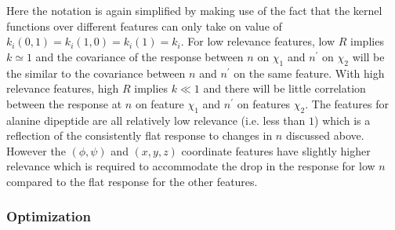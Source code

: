 Here the notation is again simplified by making use of the fact that the kernel functions over different features can only take on value of $k_{i}(0, 1)=k_{i}(1, 0) = k_{i}(1)=k_{i}$. For low relevance features, low $R$ implies $k\simeq 1$ and the covariance of the response between $n$ on $\chi_1$ and $n^{\prime}$ on $\chi_2$ will be the similar to the covariance between $n$ and $n^{\prime}$ on the same feature. With high relevance features, high $R$ implies $k \ll 1$ and there will be little correlation between the response at $n$ on feature $\chi_1$ and $n^{\prime}$ on features $\chi_2$.   The features for alanine dipeptide are all relatively low relevance (i.e. less than $1$) which is a reflection of the  consistently flat response to changes in $n$ discussed above. However the $(\phi, \psi)$ and $(x,y,z)$ coordinate features have slightly higher relevance which is required to accommodate the drop in the response for low $n$ compared to the flat response for the other features.  

\subsubsection{Optimization}\label{subsubsec:ala_opt}

